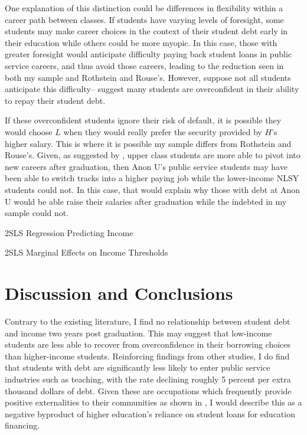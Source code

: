 \documentclass[12pt]{article}
\newcommand{\regs}{../Analysis/Regressions/Output/}
\begin{document}
	One explanation of this distinction could be differences in flexibility within a career path between classes. If students have varying levels of foresight, some students may make career choices in the context of their student debt early in their education while others could be more myopic. In this case, those with greater foresight would anticipate difficulty paying back student loans in public service careers, and thus avoid those careers, leading to the reduction seen in both my sample and Rothstein and Rouse's. However, suppose not all students anticipate this difficulty--\textcite{smith2013} suggest many students are overconfident in their ability to repay their student debt. 
	
	If these overconfident students ignore their risk of default, it is possible they would choose $L$ when they would really prefer the security provided by $H$'s higher salary. This is where it is possible my sample differs from Rothstein and Rouse's. Given, as suggested by \textcite{mcleod2009}, upper class students are more able to pivot into new careers after graduation, then Anon U's public service students may have been able to switch tracks into a higher paying job while the lower-income NLSY students could not. In this case, that would explain why those with debt at Anon U would be able raise their salaries after graduation while the indebted in my sample could not.
	
	\begin{table}
		\centering
		\caption{2SLS Regression Predicting Income}
		\resizebox{\textwidth}{!}{		
			
		}
		\label{incomeRes}
	\end{table}

	\begin{table}
		\centering
		\caption{2SLS Marginal Effects on Income Thresholds}
		\resizebox{\textwidth}{!}{		
			
		}
		\label{incomeResmarg}
	\end{table}
	
	\section{Discussion and Conclusions}
	
	Contrary to the existing literature, I find no relationship between student debt and income two years post graduation. This may suggest that low-income students are less able to recover from overconfidence in their borrowing choices than higher-income students. Reinforcing findings from other studies, I do find that students with debt are significantly less likely to enter public service industries such as teaching, with the rate declining roughly 5 percent per extra thousand dollars of debt. Given these are occupations which frequently provide positive externalities to their communities as shown in \textcite{benshem1991}, I would describe this as a negative byproduct of higher education's reliance on student loans for education financing.
	
\end{document}
